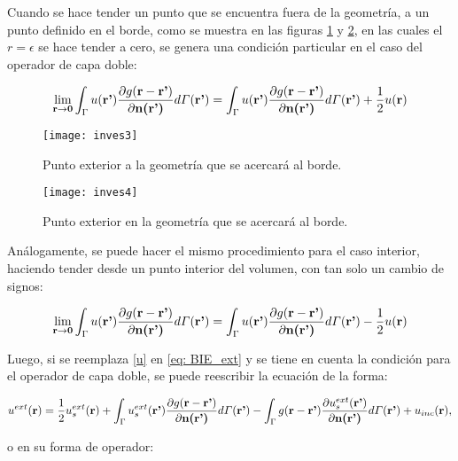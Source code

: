 \documentclass[12pt,letterpaper]{article}
\numberwithin{equation}{section}
\begin{document}
Cuando se hace tender un punto que se encuentra fuera de la geometría, a un punto definido en el borde, como se muestra en las figuras \ref{inci1} y \ref{inci2}, en las cuales el $r=\epsilon$ se hace tender a cero, se genera una condición particular en el caso del operador de capa doble:

$$\lim\limits_{\textbf{r}\rightarrow \textbf{0}}\int_{\Gamma}u(\textbf{r'})\frac{\partial g(\textbf{r}-\textbf{r'})}{\partial\textbf{n(\textbf{r'})}}d\varGamma(\textbf{r'})=\int_{\Gamma}u(\textbf{r'})\frac{\partial g(\textbf{r}-\textbf{r'})}{\partial\textbf{n(\textbf{r'})}}d\varGamma(\textbf{r'}) + \frac{1}{2}u(\textbf{r})$$


\begin{figure}[H]
	\centering
	\texttt{[image: inves3]}
	\caption{Punto exterior a la geometría que se acercará al borde. }
	\label{inci1}
\end{figure}

\begin{figure}[H]
	\centering
	\texttt{[image: inves4]}
	\caption{Punto exterior en la geometría que se acercará al borde. }
	\label{inci2}
\end{figure}

Análogamente, se puede hacer el mismo procedimiento para el caso interior, haciendo tender desde un punto interior del volumen, con tan solo un cambio de signos:

$$\lim\limits_{\textbf{r}\rightarrow \textbf{0}}\int_{\Gamma}u(\textbf{r'})\frac{\partial g(\textbf{r}-\textbf{r'})}{\partial\textbf{n(\textbf{r'})}}d\varGamma(\textbf{r'})=\int_{\Gamma}u(\textbf{r'})\frac{\partial g(\textbf{r}-\textbf{r'})}{\partial\textbf{n(\textbf{r'})}}d\varGamma(\textbf{r'}) - \frac{1}{2}u(\textbf{r})$$

Luego, si se reemplaza \ref{u} en \ref{eq: BIE_ext} y se tiene en cuenta la condición para el operador de capa doble, se puede reescribir la ecuación de la forma:

\begin{equation}
u^{ext}(\textbf{r}) = \frac{1}{2}u_s^{ext}(\textbf{r}) + \int_{\Gamma}u_s^{ext}(\textbf{r'})\frac{\partial g(\textbf{r}-\textbf{r'})}{\partial\textbf{n(\textbf{r'})}}d\varGamma(\textbf{r'}) - \int_{\Gamma}g(\textbf{r}-\textbf{r'})\frac{\partial u_s^{ext}(\textbf{r'})}{\partial\textbf{n(\textbf{r'})}}d\varGamma(\textbf{r'}) +  u_{inc}(\textbf{r}),
\label{eq: BIE_borde}	
\end{equation}

\noindent o en su forma de operador:
\end{document}
